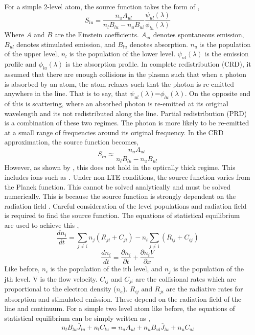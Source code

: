 For a simple 2-level atom, the source function takes the form of \citep{hubeny_theory_2015,levens_diagnostics_2018},
\begin{equation}
    S_{lu}=\frac{n_uA_{ul}}{n_lB_{lu}-n_uB_{ul}}\frac{\psi_{ul}(\lambda)}{\phi_{lu}(\lambda)}
\end{equation}
Where $A$ and $B$ are the Einstein coefficients. $A_{ul}$ denotes spontaneous emission, $B_{ul}$ denotes stimulated emission, and $B_{lu}$ denotes absorption. $n_u$ is the population of the upper level, $n_l$ is the population of the lower level. $\psi_{ul}(\lambda)$ is the emission profile and ${\phi_{lu}(\lambda)}$ is the absorption profile. In complete redistribution (CRD), it assumed that there are enough collisions in the plasma such that when a photon is absorbed by an atom, the atom relaxes such that the photon is re-emitted anywhere in the line. That is to say, that $\psi_{ul}(\lambda)$=${\phi_{lu}(\lambda)}$. On the opposite end of this is scattering, where an absorbed photon is re-emitted at its original wavelength and its not redistributed along the line. Partial redistribution (PRD) is a combination of these two regimes. The photon is more likely to be re-emitted at a small range of frequencies around its original frequency. In the CRD approximation, the source function becomes,
\begin{equation}
    S_{lu}\approx\frac{n_uA_{ul}}{n_lB_{lu}-n_uB_{ul}}
\end{equation}
However, as shown by \cite{milkey_resonance_1974}, this does not hold in the optically thick regime. This includes ions such as \mgii. Under non-LTE conditions, the source function varies from the Planck function. This cannot be solved analytically and must be solved numerically. This is because the source function is strongly dependent on the radiation field \citep{labrosse_physics_2010}. Careful consideration of the level populations and radiation field is required to find the source function. The equations of statistical equilibrium are used to achieve this \citep{labrosse_physics_2010},
\begin{equation}
    \frac{dn_i}{dt}=\sum_{j\neq i} n_j\left(R_{ji}+C_{ji}\right)-n_i\sum_{j\neq i} \left(R_{ij}+C_{ij}\right)
\end{equation}
\begin{equation}
    \frac{dn_i}{dt}=\frac{\partial n_i}{\partial t}+\frac{\partial n_iV}{\partial x}
\end{equation}
Like before, $n_i$ is the population of the ith level, and $n_j$ is the population of the jth level. V is the flow velocity. $C_{ij}$ and $C_{ji}$ are the collisional rates which are proportional to the electron density ($n_e$). $R_{ij}$ and $R_{ji}$ are the radiative rates for absorption and stimulated emission. These depend on the radiation field of the line and continuum.  For a simple two level atom like before, the equations of statistical equilibrium can be simply written as \citep[ignoring the time and velocity terms,][]{labrosse_physics_2010},
\begin{equation}
    n_lB_{lu}\overline{J}_{lu}+n_lC_{lu}=n_uA_{ul}+n_uB_{ul}\overline{J}_{lu}+n_uC_{ul}
\end{equation}

